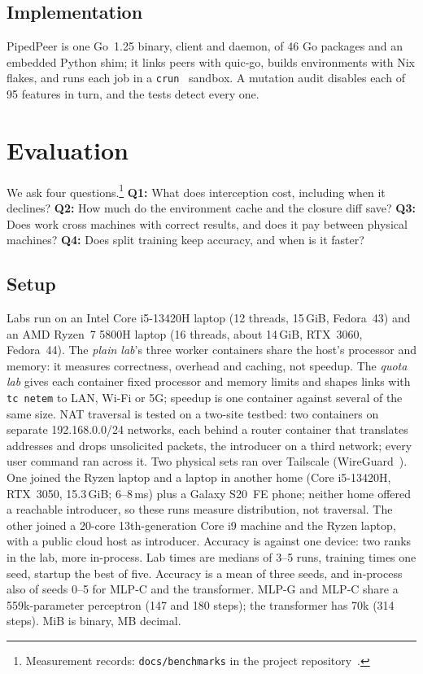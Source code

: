 \documentclass[conference]{IEEEtran}
\begin{document}
\subsection{Implementation}

PipedPeer is one Go~1.25 binary, client and daemon, of 46 Go packages and an
embedded Python shim; it links peers with quic-go, builds environments with Nix
flakes, and runs each job in a \texttt{crun}~\cite{crun} sandbox. A mutation
audit disables each of 95 features in turn, and the tests detect every one.

\section{Evaluation}

We ask four questions.\footnote{Measurement records: \texttt{docs/benchmarks}
in the project repository~\cite{pipedpeerrepo}.} \textbf{Q1:} What does
interception cost, including when it declines? \textbf{Q2:} How much do the
environment cache and the closure diff save? \textbf{Q3:} Does work cross
machines with correct results, and does it pay between physical machines?
\textbf{Q4:} Does split training keep accuracy, and when is it faster?

\subsection{Setup}
\label{sec:setup}

Labs run on an Intel Core i5-13420H laptop (12 threads, 15\,GiB, Fedora~43)
and an AMD Ryzen~7 5800H laptop (16 threads, about 14\,GiB, RTX~3060, Fedora~44).
The \emph{plain lab}'s three worker containers share the host's processor and
memory: it measures correctness, overhead and caching, not speedup. The
\emph{quota lab} gives each container fixed processor and memory limits and
shapes links with \texttt{tc netem} to LAN, Wi-Fi or 5G; speedup is one
container against several of the same size. NAT traversal is tested on a
two-site testbed: two containers on separate 192.168.0.0/24 networks, each
behind a router container that translates addresses and drops unsolicited
packets, the introducer on a third network; every user command ran across it.
Two physical sets ran over Tailscale (WireGuard~\cite{donenfeld2017wireguard}).
One joined the Ryzen laptop and a laptop in another home (Core i5-13420H,
RTX~3050, 15.3\,GiB; 6--8\,ms) plus a Galaxy S20~FE phone; neither home offered
a reachable introducer, so these runs measure distribution, not traversal. The
other joined a 20-core 13th-generation Core i9 machine and the Ryzen laptop,
with a public cloud host as introducer. Accuracy is against one device: two
ranks in the lab, more in-process. Lab times are medians of 3--5 runs, training
times one seed, startup the best of five. Accuracy is a mean of three seeds,
and in-process also of seeds 0--5 for MLP-C and the transformer. MLP-G and MLP-C
share a 559k-parameter perceptron (147 and 180 steps); the transformer has 70k
(314 steps). MiB is binary, MB decimal.
\end{document}
